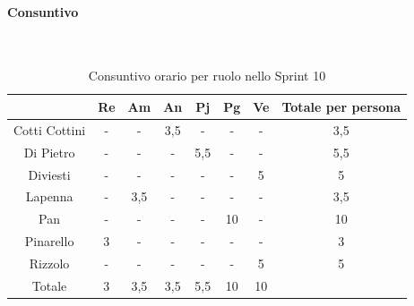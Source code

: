 \documentclass{article}
\begin{document}
                \paragraph{Consuntivo}\mbox{}\\
                \begin{table}[H]
                    \centering
                    \begin{tabular}{|c|c|c|c|c|c|c|c|}
                    \hline
                                    & Re  & Am  & An  & Pj  & Pg  & Ve  & Totale per persona \\ \hline
                    Cotti Cottini & -   & -   & 3,5 & -   & -   & -   & 3,5               \\ \hline
                    Di Pietro     & -   & -   & -   & 5,5 & -   & -   & 5,5                 \\ \hline
                    Diviesti      & -   & -   & -   & -   & -   & 5   & 5               \\ \hline
                    Lapenna       & -   & 3,5 & -   & -   & -   & -   & 3,5                 \\ \hline
                    Pan           & -   & -   & -   & -   & 10  & -   & 10                \\ \hline
                    Pinarello     & 3   & -   & -   & -   & -   & -   & 3                 \\ \hline
                    Rizzolo       & -   & -   & -   & -   & -   & 5   & 5                 \\ \hline
                    Totale        & 3   & 3,5 & 3,5 & 5,5 & 10  & 10  &                     \\ \hline
                    \end{tabular}
                    \caption{Consuntivo orario per ruolo nello Sprint 10}
                \end{table}

\end{document}
